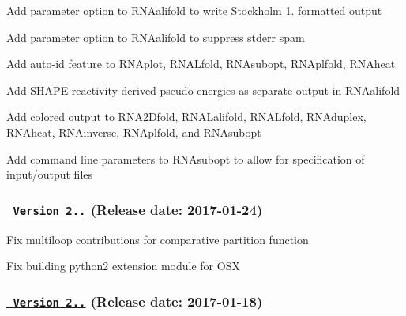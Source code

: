 \begin{DoxyItemize}
\item Add parameter option to R\+N\+Aalifold to write Stockholm 1. formatted output
\item Add parameter option to R\+N\+Aalifold to suppress stderr spam
\item Add auto-\/id feature to R\+N\+Aplot, R\+N\+A\+Lfold, R\+N\+Asubopt, R\+N\+Aplfold, R\+N\+Aheat
\item Add S\+H\+A\+PE reactivity derived pseudo-\/energies as separate output in R\+N\+Aalifold
\item Add colored output to R\+N\+A2\+Dfold, R\+N\+A\+Lalifold, R\+N\+A\+Lfold, R\+N\+Aduplex, R\+N\+Aheat, R\+N\+Ainverse, R\+N\+Aplfold, and R\+N\+Asubopt
\item Add command line parameters to R\+N\+Asubopt to allow for specification of input/output files
\end{DoxyItemize}

\subsubsection*{\href{https://github.com/ViennaRNA/ViennaRNA/compare/v2.3.2...v2.3.3}{\texttt{ Version 2..}} (Release date\+: 2017-\/01-\/24)}


\begin{DoxyItemize}
\item Fix multiloop contributions for comparative partition function
\item Fix building python2 extension module for O\+SX
\end{DoxyItemize}

\subsubsection*{\href{https://github.com/ViennaRNA/ViennaRNA/compare/v2.3.1...v2.3.2}{\texttt{ Version 2..}} (Release date\+: 2017-\/01-\/18)}


